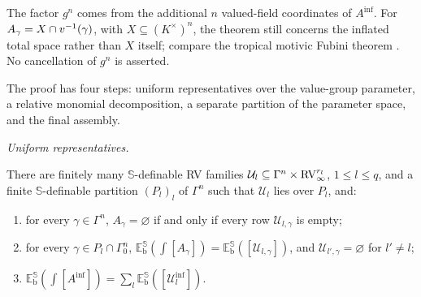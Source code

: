The factor $g^n$ comes from the additional $n$ valued-field coordinates of
$A^{\mathrm{inf}}$. For $A_\gamma=X\cap v^{-1}(\gamma)$, with
$X\subseteq(K^\times)^n$, the theorem still concerns the inflated total
space rather than $X$ itself; compare the tropical motivic Fubini theorem
\cite[Theorem 3.1.3]{NicaisePayne}. No cancellation of $g^n$ is asserted.

The proof has four steps: uniform representatives over the value-group
parameter, a relative monomial decomposition, a separate partition of the
parameter space, and the final assembly.

\medskip
\noindent\emph{Uniform representatives.}

\begin{lem}\label{lem:inflated:uniform}
There are finitely many $\mathbb S$-definable RV families
$\mathcal U_l\subseteq\Gamma^n\times\mathrm{RV}_\infty^{r_l}$, $1\leq l\leq q$, and a
finite $\mathbb S$-definable partition $(P_l)_l$ of $\Gamma^n$ such that
$\mathcal U_l$ lies over $P_l$, and:
\begin{enumerate}
\item for every $\gamma\in\Gamma^n$, $A_\gamma=\varnothing$ if and only if
every row $\mathcal U_{l,\gamma}$ is empty;
\item for every $\gamma\in P_l\cap\Gamma_0^n$,
$\mathbb E_{\mathrm b}^{\mathbb S}(\int[A_\gamma])
 =\mathbb E_{\mathrm b}^{\mathbb S}([\mathcal U_{l,\gamma}])$, and
$\mathcal U_{l',\gamma}=\varnothing$ for $l'\neq l$;
\item $\mathbb E_{\mathrm b}^{\mathbb S}(\int[A^{\mathrm{inf}}])
 =\sum_l\mathbb E_{\mathrm b}^{\mathbb S}([\mathcal U_l^{\mathrm{inf}}])$.
\end{enumerate}
\end{lem}

